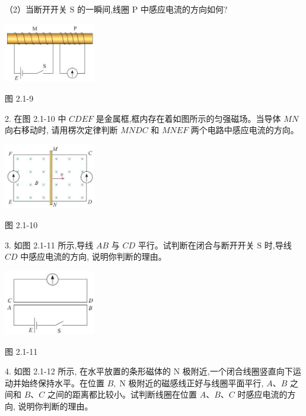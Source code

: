 \documentclass[10pt]{article}
\begin{document}
（2）当断开开关 \(\mathrm{S}\) 的一瞬间,线圈 \(\mathrm{P}\) 中感应电流的方向如何?

\begin{center}
\includegraphics[max width=0.3\textwidth]{images/01910e72-c5b7-7ed5-a6d4-fb3a5faefc32_34_847537.jpg}
\end{center}

图 2.1-9

2. 在图 2.1-10 中 \({CDEF}\) 是金属框,框内存在着如图所示的匀强磁场。当导体 \({MN}\) 向右移动时, 请用楞次定律判断 \({MNDC}\) 和 \({MNEF}\) 两个电路中感应电流的方向。

\begin{center}
\includegraphics[max width=0.3\textwidth]{images/01910e72-c5b7-7ed5-a6d4-fb3a5faefc32_34_495440.jpg}
\end{center}

图 2.1-10

3. 如图 2.1-11 所示,导线 \({AB}\) 与 \({CD}\) 平行。试判断在闭合与断开开关 \(\mathrm{S}\) 时,导线 \({CD}\) 中感应电流的方向, 说明你判断的理由。

\begin{center}
\includegraphics[max width=0.3\textwidth]{images/01910e72-c5b7-7ed5-a6d4-fb3a5faefc32_34_829824.jpg}
\end{center}

图 2.1-11

4. 如图 2.1-12 所示, 在水平放置的条形磁体的 \(\mathrm{N}\) 极附近,一个闭合线圈竖直向下运动并始终保持水平。在位置 \(B,\mathrm{\;N}\) 极附近的磁感线正好与线圈平面平行, \(A\text{、}B\) 之间和 \(B\text{、}C\) 之间的距离都比较小。试判断线圈在位置 \(A\text{、}B\text{、}C\) 时感应电流的方向, 说明你判断的理由。
\end{document}
